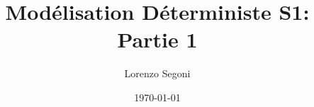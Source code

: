 \documentclass[12pt,a4paper]{book}
\begin{document}
\frontmatter
\title{Modélisation Déterministe S1: Partie 1}
\author{Lorenzo Segoni}
\date{\today}
\maketitle

\tableofcontents

\mainmatter






 

 


\end{document}
